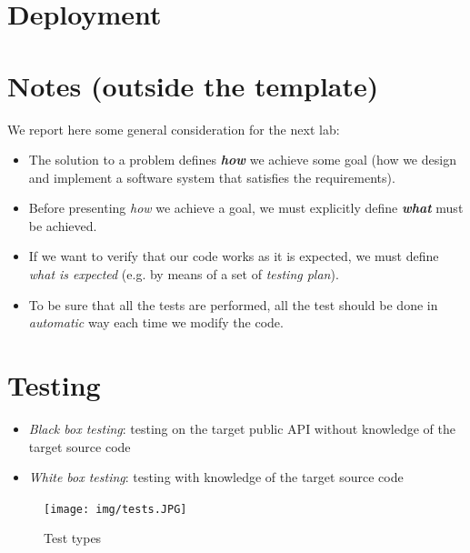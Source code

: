 \documentclass{llncs}
\newcommand{\labelsec}[1]{\label{sec:#1}}
\newcommand{\labelfig}[1]{\label{fig:#1}}
\begin{document}
\section{Deployment}
\labelsec{Deployment}
 
\newpage
\section{Notes (outside the template)}
\labelsec{Notes}
We report here some general consideration for the next lab:
\begin{itemize}
  \item The solution to a problem defines \textbf{\emph{how}} we achieve some goal (how we design and implement a software system that satisfies the requirements).
  \item Before presenting \emph{how} we achieve a goal, we must explicitly define \textbf{\emph{what}} must be achieved.
  \item If we want to verify that our code works as it is expected, we must define \emph{what is expected} (e.g. by means of a set of \emph{testing plan}).
  \item  To be sure that all the tests are performed, all the test should be done in \emph{automatic} way each time we modify the code.
 \end{itemize}

\section{Testing}
\labelsec{testing}
\begin{itemize}
  \item \emph{Black box testing}: testing on the target public API without knowledge of the target source code
  \item \emph{White box testing}: testing with knowledge of the target source code
\end{itemize}

\begin{figure}
    \centering
   \texttt{[image: img/tests.JPG]}\\
  \caption{Test types}\labelfig{testTypes}
\end{figure}
\end{document}
